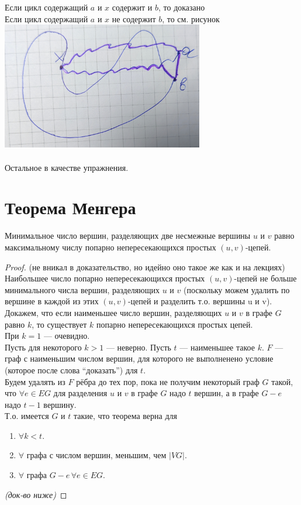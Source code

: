 \documentclass[12pt]{article}
\begin{document}
			Если цикл содержащий $a$ и $x$ содержит и $b$, то доказано\\
			Если цикл содержащий $a$ и $x$ не содержит $b$, то см. рисунок\\
			\includegraphics[width=250pt]{1}\\
		\\
		Остальное в качестве упражнения.\\
	\qedsymbol

\section{Теорема Менгера}
		Минимальное число вершин, разделяющих две несмежные вершины $u$ и $v$ равно максимальному числу попарно непересекающихся простых $(u,v)$-цепей.
	\begin{proof}
		(не вникал в доказательство, но идейно оно такое же как и на лекциях)\\
		Наибольшее число попарно непересекающихся простых $(u,v)$-цепей не больше минимального числа вершин, разделяющих $u$ и $v$ (поскольку можем удалить по вершине в каждой из этих $(u,v)$-цепей и разделить т.о. вершины u и v).\\
		Докажем, что если наименьшее число вершин, разделяющих $u$ и $v$ в графе $G$ равно $k$, то существует $k$ попарно непересекающихся простых цепей.\\
		При $k=1$ — очевидно.\\
		Пусть для некоторого $k>1$ — неверно. Пусть $t$ — наименьшее такое $k$. $F$ — граф с наименьшим числом вершин, для которого не выполненено условие
		(которое после слова ``доказать'') для $t$.\\
		Будем удалять из $F$ рёбра до тех пор, пока не получим некоторый граф $G$ такой, что $\forall e \in EG$ для разделения $u$ и $v$ в графе $G$ надо $t$ вершин,
		а в графе $G-e$ надо $t-1$ вершину.\\
		Т.о. имеется $G$ и $t$ такие, что теорема верна для
		\begin{enumerate}
			\item $\forall k < t$.
			\item $\forall$ графа с числом вершин, меньшим, чем $|VG|$.
			\item $\forall$ графа $G-e \, \forall e \in EG$.
		\end{enumerate}
		\textit{(док-во ниже)}
	\end{proof}
\end{document}
